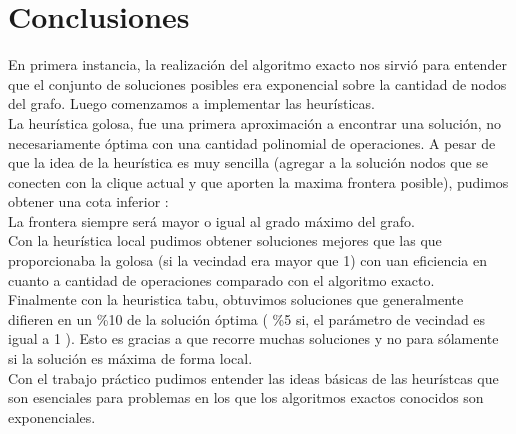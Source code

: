 \section{Conclusiones}
En primera instancia, la realizaci\'on del algoritmo exacto nos sirvi\'o para entender que el conjunto de soluciones
posibles era exponencial sobre la cantidad de nodos del grafo.
Luego comenzamos a implementar las heur\'isticas.\\

La heur\'istica golosa, fue una primera aproximaci\'on a encontrar una soluci\'on,
no necesariamente \'optima con una cantidad polinomial de operaciones. A pesar de que la idea de la heur\'istica es muy sencilla
(agregar a la soluci\'on nodos que se conecten con la clique actual y que aporten la maxima frontera posible), pudimos obtener una cota
inferior :\\
La frontera siempre ser\'a mayor o igual al grado m\'aximo del grafo.\\


Con la heur\'istica local pudimos obtener soluciones mejores que las que proporcionaba la golosa (si la vecindad era mayor que 1) con
uan eficiencia en cuanto a cantidad de operaciones comparado con el algoritmo exacto.\\


Finalmente con la heuristica tabu, obtuvimos soluciones que generalmente difieren
en un \%10 de la soluci\'on \'optima ( \%5 si, el par\'ametro de vecindad es igual a 1 ). Esto es gracias a que recorre muchas soluciones
y no para s\'olamente si la soluci\'on es m\'axima de forma local.\\


Con el trabajo pr\'actico pudimos entender las ideas b\'asicas de las heur\'istcas que son esenciales para problemas en los que los algoritmos exactos
conocidos son exponenciales. 
